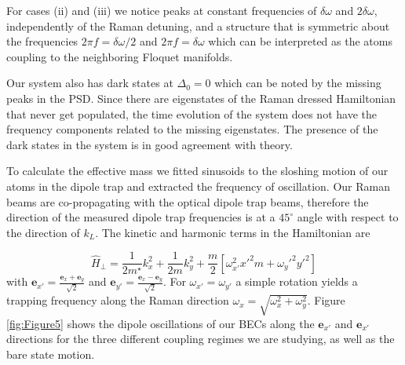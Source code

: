 
For cases (ii) and (iii) we notice peaks at constant frequencies of $\delta\omega$ and $2\delta\omega$, independently of the Raman detuning, and a structure that is symmetric about the frequencies $2\pi f=\delta\omega/2$ and $2\pi f=\delta\omega$  which can be interpreted as the atoms coupling to the neighboring Floquet manifolds.  

Our system also has dark states at $\Delta_0=0$ which can be noted by the missing peaks in the PSD. Since there are eigenstates of the Raman dressed Hamiltonian that never get populated, the time evolution of the system does not have the frequency components related to the missing eigenstates. The presence of the dark states in the system is in good agreement with theory. 

To calculate the effective mass we fitted sinusoids to the sloshing motion of our atoms in the dipole trap and extracted the frequency of oscillation. Our Raman beams are co-propagating with the optical dipole trap beams, therefore the direction of the measured dipole trap frequencies is at a $45^{\circ}$ angle with respect to the direction of $k_L$. The kinetic and harmonic terms in the Hamiltonian are

\begin{equation}
\hat{H}_{\perp}=\frac{1}{2m^{\star}}k_x^2 + \frac{1}{2m}k_y^2+\frac{m}{2}[\omega_{x'}^2x'^2m+\omega_y'^2y'^2]
\end{equation}
%
with $\mathbf{e}_{x'}=\frac{\mathbf{e}_{x}+\mathbf{e}_{y}}{\sqrt{2}}$ and  $\mathbf{e}_{y'}=\frac{\mathbf{e}_{x}-\mathbf{e}_{y}}{\sqrt{2}}$. For $\omega_{x'}=\omega_{y'}$ a simple rotation yields a trapping frequency along the Raman direction $\omega_x=\sqrt{\omega_x^2+\omega_y^2}$.   
Figure \ref{fig:Figure5} shows the dipole oscillations of our BECs along the $\mathbf{e}_{x'}$ and $\mathbf{e}_{x'}$ directions for the three different coupling regimes we are studying, as well as the bare state motion. 

